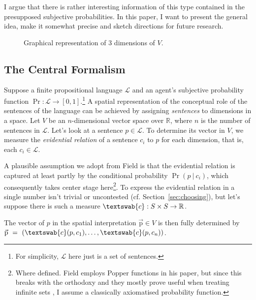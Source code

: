 \documentclass[11pt, a4paper]{scrartcl}
\renewcommand{\i}[1]{\emph{#1}}
\renewcommand{\L}{\mathcal{L}}
\renewcommand{\v}[1]{\vec{\mathrm{#1}}}
\newcommand{\m}[1]{\textswab{#1}}
\newcommand{\given}[1][]{\:#1\vert\:}
\begin{document}
I argue that there is rather interesting information of this type contained in the presupposed subjective probabilities. In this paper, I want to present the general idea, make it somewhat precise and sketch directions for future research.

\begin{figure}
    \centering
{}
\caption{Graphical representation of 3 dimensions of $V$.}
\end{figure}

\subsection{The Central Formalism}\label{sec:central}

Suppose a finite propositional language $\L$ and an agent's subjective probability function $\Pr: \L \rightarrow [0,1]$.\footnote{For simplicity, $\L$ here just is a set of sentences.} A spatial representation of the conceptual role of the sentences of the language can be achieved by assigning \i{sentences} to dimensions in a space. Let $V$ be an $n$-dimensional vector space over $\mathbb{R}$, where $n$ is the number of sentences in $\L$. Let's look at a sentence $p \in \L$. To determine its vector in $V$, we measure the \i{evidential relation} of a sentence $c_i$ to $p$ for each dimension, that is, each $c_i \in \L$. 

A plausible assumption we adopt from Field is that the evidential relation is captured at least partly by the conditional probability $\Pr(p \given c_i)$, which consequently takes center stage here\footnote{Where defined. Field employs Popper functions in his paper, but since this breaks with the orthodoxy and they mostly prove useful when treating infinite sets \parencite[1352]{Leitgeb2013-LEIRBS}, I assume a classically axiomatised probability function.}. To express the evidential relation in a single number isn't trivial or uncontested (cf. Section~\ref{sec:choosing}), but let's suppose there is such a measure ${\m{c}: S \times S \rightarrow \mathbb{R}}$. 

The vector of $p$ in the spatial interpretation $\v{p} \in V$ is then fully determined by ${\v{p}~=~(\m{c}({p, c_1}),\dots, \m{c}(p, c_n))}$.
\end{document}
